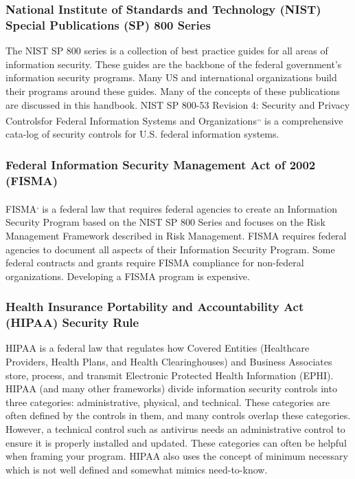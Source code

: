 \subsubsection{National Institute of Standards and Technology (NIST) Special Publications (SP) 800 Series}
The NIST SP 800 series is a collection of best practice guides for all areas of information security. These guides are the backbone of the federal government's information security programs. Many US and international organizations build their programs around these guides. Many of the concepts of these publications are discussed in this handbook. NIST SP 800-53 Revision 4:  Security and Privacy Controlsfor Federal Information Systems and Organizations\textsuperscript{,}\textsuperscript{,} is a comprehensive cata-log of security controls for U.S. federal information systems.
\subsubsection{Federal Information Security Management Act of 2002 (FISMA)}
FISMA\textsuperscript{,} is a federal law that requires federal agencies to create an Information Security Program based on the NIST SP 800 Series and focuses on the Risk Management Framework described in Risk Management. FISMA requires federal agencies to document all aspects of their Information Security Program. Some federal contracts and grants require FISMA compliance for non-federal organizations. Developing a FISMA program is expensive.
\subsubsection{Health Insurance Portability and Accountability Act (HIPAA) Security Rule}
HIPAA is a federal law that regulates how Covered Entities (Healthcare Providers, Health Plans, and Health Clearinghouses) and Business Associates store, process, and transmit Electronic Protected Health Information (EPHI). HIPAA (and many other frameworks) divide information security controls into three categories: administrative, physical, and technical. These categories are often defined by the controls in them, and many controls overlap these categories. However, a technical control such as antivirus needs an administrative control to ensure it is properly installed and updated. These categories can often be helpful when framing your program. HIPAA also uses the concept of minimum necessary which is not well defined and somewhat mimics need-to-know.
